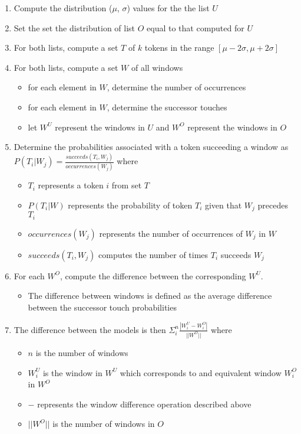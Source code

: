 \begin{enumerate}
\item Compute the distribution ($\mu$, $\sigma$) values for the 
  the list $U$
\item Set the set the distribution of list $O$ equal to that 
  computed for $U$
\item For both lists, compute a set $T$ of $k$ tokens in the range $[\mu-2\sigma, \mu+2\sigma]$
\item For both lists, compute a set $W$ of all windows
  \begin{itemize}
  \item for each element in $W$, determine the number of occurrences
  \item for each element in $W$, determine the successor touches
  \item let $W^U$ represent the windows in $U$ and
    $W^O$ represent the windows in $O$
  \end{itemize}
\item Determine the probabilities associated with a token succeeding a window
  as $P(T_i|W_j) = \frac{succeeds(T_i, W_j)}{occurrences(W_j)}$ where
  \begin{itemize}
  \item $T_i$ represents a token $i$ from set $T$
  \item $P(T_i|W)$ represents the probability 
    of token $T_i$ given that $W_j$ precedes $T_i$
  \item $occurrences(W_j)$ represents the number of occurrences of $W_j$ in $W$
  \item $succeeds(T_i, W_j)$ computes the number of times $T_i$ succeeds $W_j$
  \end{itemize}
\item For each $W^O$, compute the difference between the corresponding $W^U$.
  \begin{itemize}
  \item The difference between windows is defined as the average difference
  between the successor touch probabilities
  \end{itemize}
\item The difference between the models is then
  $\Sigma_i^n \frac{|W_i^U-W_i^O|}{||W^O||}$ where 
  \begin{itemize}
  \item $n$ is the number of windows
  \item $W_i^U$ is the window in $W^U$ which corresponds to
    and equivalent window $W_i^O$ in $W^O$
  \item $-$ represents the window difference operation described above
  \item $||W^O||$ is the number of windows in $O$
  \end{itemize}
\end{enumerate}
